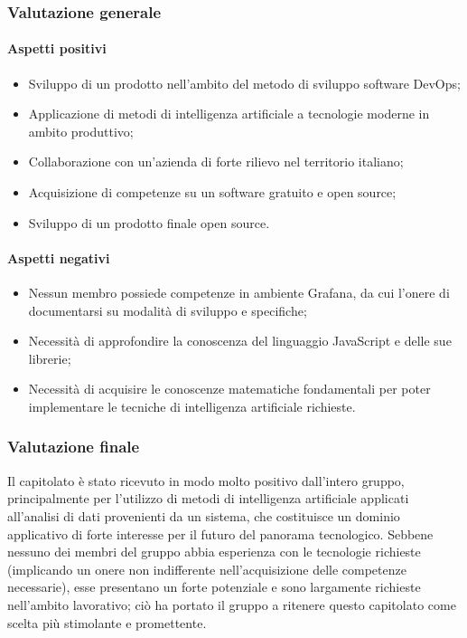 	\subsubsection{Valutazione generale}
	\paragraph{Aspetti positivi}
	\begin{itemize}
		\item{Sviluppo di un prodotto nell'ambito del metodo di sviluppo software DevOps;}
		\item{Applicazione di metodi di intelligenza artificiale a tecnologie moderne in ambito produttivo;}
		\item{Collaborazione con un'azienda di forte rilievo nel territorio italiano;}
		\item{Acquisizione di competenze su un software gratuito e open source;}
		\item{Sviluppo di un prodotto finale open source.}
	\end{itemize}
	\paragraph{Aspetti negativi}	
	\begin{itemize}
		\item{Nessun membro possiede competenze in ambiente Grafana, da cui l'onere di documentarsi su modalità di sviluppo e  specifiche;} 
		\item{Necessità di approfondire la conoscenza del linguaggio JavaScript e delle sue librerie;}
		\item{Necessità di acquisire le conoscenze matematiche fondamentali per poter implementare le tecniche di intelligenza artificiale richieste.}
	\end{itemize} 
	\subsubsection{Valutazione finale}
	
	Il capitolato è stato ricevuto in modo molto positivo dall'intero gruppo, principalmente per l'utilizzo di metodi di intelligenza artificiale applicati all'analisi di dati provenienti da un sistema, che costituisce un dominio applicativo di forte interesse per il futuro del panorama tecnologico. Sebbene nessuno dei membri del gruppo abbia esperienza con le tecnologie richieste (implicando un onere non indifferente nell'acquisizione delle competenze necessarie), esse presentano un forte potenziale e sono largamente richieste nell'ambito lavorativo; ciò ha portato il gruppo a ritenere questo capitolato come scelta più stimolante e promettente.
	\pagebreak		
	
